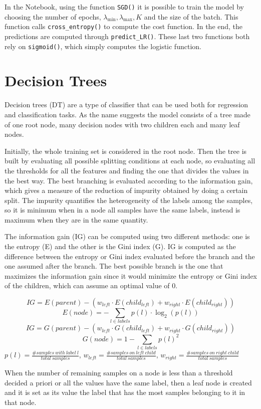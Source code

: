 \documentclass{Configuration_Files/PoliMi3i_thesis}
\begin{document}
In the Notebook, using the function \verb|SGD()| it is possible to train the model by choosing the number of epochs, $\lambda_{\min}, \lambda_{\max}, K$ and the size of the batch.
This function calls \verb|cross_entropy()| to compute the cost function. In the end, the predictions are computed through \verb|predict_LR()|. These last two functions both rely on \verb|sigmoid()|, which simply computes the logistic function.

\section{Decision Trees}
Decision trees (DT) are a type of classifier that can be used both for regression and classification tasks. As the name suggests the model consists of a tree made of one root node, many decision nodes with two children each and many leaf nodes.

Initially, the whole training set is considered in the root node. Then the tree is built by evaluating all possible splitting conditions at each node, so evaluating all the thresholds for all the features and finding the one that divides the values in the best way. The best branching is evaluated according to the information gain, which gives a measure of the reduction of impurity obtained by doing a certain split. The impurity quantifies the heterogeneity of the labels among the samples, so it is minimum when in a node all samples have the same labels, instead is maximum when they are in the same quantity.

The information gain (IG) can be computed using two different methods: one is the entropy (E) and the other is the Gini index (G). IG is computed as the difference between the entropy or Gini index evaluated before the branch and the one assumed after the branch. The best possible branch is the one that maximizes the information gain since it would minimize the entropy or Gini index of the children, which can assume an optimal value of 0.

$$IG = E(parent) - (w_{left} \cdot E(child_{left})+w_{right} \cdot E(child_{right}))$$ 
$$E(node) = - \sum_{l \in labels} p(l) \cdot \log_2(p(l))$$
$$IG = G(parent) - (w_{left} \cdot G(child_{left})+w_{right} \cdot G(child_{right}))$$ 
$$G(node) = 1 - \sum_{l \in labels}p(l)^2$$ 
$p(l) = \frac{\#samples\:with\:label\:l}{total\:samples}$,
$w_{left} = \frac{\#samples\:on\:left\:child}{total\:samples}$,
$w_{right} = \frac{\#samples\:on\:right\:child}{total\:samples}$

 When the number of remaining samples on a node is less than a threshold decided a priori or all the values have the same label, then a leaf node is created and it is set as its value the label that has the most samples belonging to it in that node.
\end{document}

